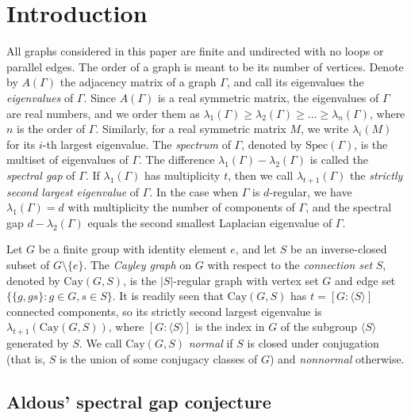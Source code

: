 \documentclass[12pt, a4paper]{article}
\theoremstyle{definition}
\begin{document}
\section{Introduction}\label{sec:intro}

All graphs considered in this paper are finite and undirected with no loops or parallel edges. The order of a graph is meant to be its number of vertices. Denote by $A(\Gamma)$ the adjacency matrix of a graph $\Gamma$, and call its eigenvalues the \emph{eigenvalues} of $\Gamma$. Since $A(\Gamma)$ is a real symmetric matrix, the eigenvalues of $\Gamma$ are real numbers, and we order them as $\lambda_1(\Gamma) \geq \lambda_2(\Gamma) \geq \dots \geq \lambda_n(\Gamma)$, where $n$ is the order of $\Gamma$. Similarly, for a real symmetric matrix $M$, we write $\lambda_i(M)$ for its $i$-th largest eigenvalue. The \emph{spectrum} of $\Gamma$, denoted by $\mathrm{Spec}(\Gamma)$, is the multiset of eigenvalues of $\Gamma$. The difference $\lambda_1(\Gamma) - \lambda_2(\Gamma)$ is called the \emph{spectral gap} of $\Gamma$. If  $\lambda_1(\Gamma)$ has multiplicity $t$, then we call $\lambda_{t+1}(\Gamma)$ the \emph{strictly second largest eigenvalue} of $\Gamma$. In the case when $\Gamma$ is $d$-regular, we have $\lambda_1(\Gamma) = d$ with multiplicity the number of components of $\Gamma$, and the spectral gap $d - \lambda_2(\Gamma)$ equals the second smallest Laplacian eigenvalue of $\Gamma$.



Let $G$ be a finite group with identity element $e$, and let $S$ be an inverse-closed subset of $G \setminus \{e\}$. The \emph{Cayley graph} on $G$ with respect to the \emph{connection set} $S$, denoted by $\mathrm{Cay}(G, S)$, is the $|S|$-regular graph with vertex set $G$ and edge set $\{\{g, gs\}: g \in G, s \in S\}$. It is readily seen that $\mathrm{Cay}(G, S)$ has $t = [G:\langle S \rangle]$ connected components, so its strictly second largest eigenvalue is $\lambda_{t+1}(\mathrm{Cay}(G, S))$, where $[G:\langle S \rangle]$ is the index in $G$ of the subgroup $\langle S \rangle$ generated by $S$. We call $\mathrm{Cay}(G, S)$ \emph{normal} if $S$ is closed under conjugation (that is, $S$ is the union of some conjugacy classes of $G$) and \emph{nonnormal} otherwise. 


\subsection{Aldous' spectral gap conjecture}
\end{document}
